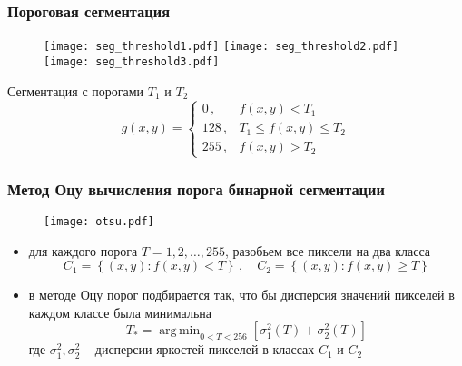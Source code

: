\documentclass[12pt, usepdftitle=false, aspectratio=1610]{beamer}
\DeclareMathOperator*{\argmin}{arg\,min}
\begin{document}
\begin{frame}
\frametitle{Пороговая сегментация}
\begin{figure}
    \centering
    \texttt{[image: seg\_threshold1.pdf]}
    \texttt{[image: seg\_threshold2.pdf]}
    \texttt{[image: seg\_threshold3.pdf]}
\end{figure}

Сегментация с порогами $T_1$ и $T_2$
$$
    g(x, y) =
    \begin{cases}
        0\,, & f(x,y) < T_1 \\        
        128\,, & T_1 \leqslant f(x,y) \leqslant T_2 \\
        255\,, & f(x,y) > T_2 
    \end{cases}
$$
\end{frame}

\begin{frame}
\frametitle{Метод Оцу вычисления порога бинарной сегментации}
\begin{figure}
    \centering
    \texttt{[image: otsu.pdf]}
\end{figure}

\begin{itemize}
    \item для каждого порога $T=1,2,\ldots,255$, разобьем все пиксели на два класса
    $$
        C_1 = \left\{(x,y): f(x,y) < T\right\}\,,\quad
        C_2 = \left\{(x,y): f(x,y) \geqslant T\right\}
    $$
    \item в методе Оцу порог подбирается так, что бы дисперсия значений пикселей в каждом классе была минимальна
    $$
        T_\ast=\argmin_{0 < T < 256} 
        \left[\sigma_1^2(T)  + \sigma_2^2(T)\right]
    $$
    где $\sigma_1^2, \sigma_2^2$ -- дисперсии яркостей пикселей в классах $C_1$ и $C_2$
\end{itemize}
\end{frame}
\end{document}
